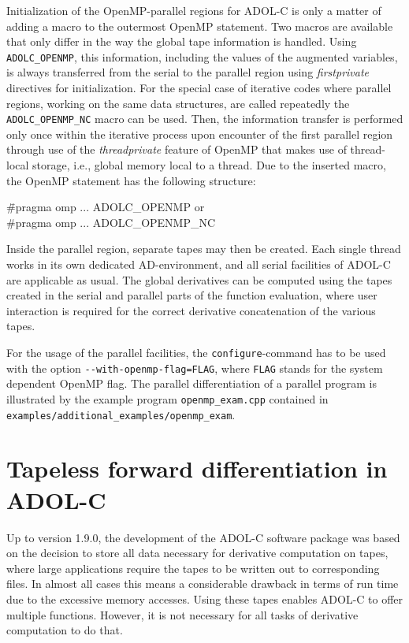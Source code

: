 \documentclass[11pt,twoside]{article}
\begin{document}
Initialization of the OpenMP-parallel regions for \mbox{ADOL-C} is only a matter of adding a macro to the outermost OpenMP statement.
Two macros are available that only differ in the way the global tape information is handled.
Using {\tt ADOLC\_OPENMP}, this information, including the values of the augmented variables, is always transferred from the serial to the parallel region using {\it firstprivate} directives for initialization.
For the special case of iterative codes where parallel regions, working on the same data structures, are called repeatedly the {\tt ADOLC\_OPENMP\_NC} macro can be used.
Then, the information transfer is performed only once within the iterative process upon encounter of the first parallel region through use of the {\it threadprivate} feature of OpenMP that makes use of thread-local storage, i.e., global memory local to a thread.
Due to the inserted macro, the OpenMP statement has the following structure:
\begin{tabbing}
\hspace*{1cm} \= {\sf \#pragma omp ... ADOLC\_OPENMP} \qquad \qquad or \\
              \> {\sf \#pragma omp ... ADOLC\_OPENMP\_NC}
\end{tabbing}
Inside the parallel region, separate tapes may then be created.
Each single thread works in its own dedicated AD-environment, and all
serial facilities of \mbox{ADOL-C} are applicable as usual. The global
derivatives can be computed using the tapes created in the serial and
parallel parts of the function evaluation, where user interaction is
required for the correct derivative concatenation of the various tapes.

For the usage of the parallel facilities, the \verb=configure=-command
has to be used with the option \verb?--with-openmp-flag=FLAG?, where 
\verb=FLAG= stands for the system dependent OpenMP flag.
The parallel differentiation of a parallel program is illustrated
by the example program \verb=openmp_exam.cpp= contained in \verb=examples/additional_examples/openmp_exam=.
%
%
\section{Tapeless forward differentiation in ADOL-C}
\label{tapeless}
%
Up to version 1.9.0, the development of the ADOL-C software package
was based on the decision to store all data necessary for derivative
computation on tapes, where large applications require the tapes to be
written out to corresponding files. In almost all cases this means
a considerable drawback in terms of run time due to the excessive
memory accesses. Using these tapes enables ADOL-C to offer multiple
functions. However, it is not necessary for all tasks of derivative
computation to do that. 
\end{document}

